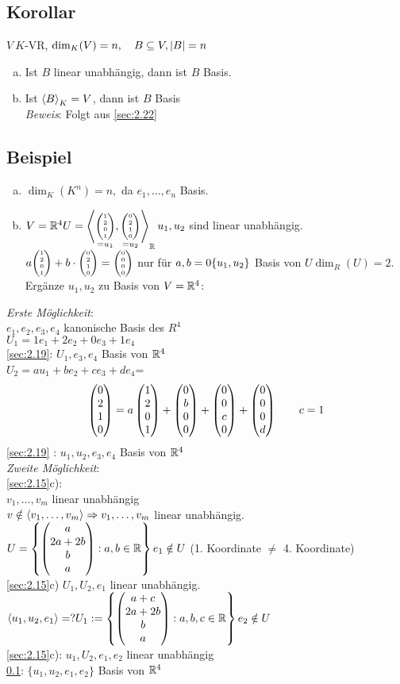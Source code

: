 \subsection{Korollar}\label{sec:2.24}
$V\ K$-VR, $\dim_K(V) = n,\quad B \subseteq V,\lvert B \rvert = n$
\begin{enumerate}[a)]
\item Ist $B$ linear unabhängig, dann ist $B$ Basis.
\item Ist $\left\langle B\right\rangle_K = V$, dann ist $B$ Basis\\
\emph{Beweis}: Folgt aus \ref{sec:2.22}
\end{enumerate}
\subsection{Beispiel}
\begin{enumerate}[a)]
\item $\dim_K(K^n) = n,$ da $e_1,\ldots,e_n$ Basis.
\item $V = \mathbb{R}^4\\
U = \left\langle\underset{= u_1}{\tiny\begin{pmatrix} 1\\2\\0\\1 \end{pmatrix}},\underset{= u_2}{\tiny\begin{pmatrix} 0\\2\\1\\0 \end{pmatrix}}\right\rangle_{\mathbb{R}}\\
u_1,u_2$ sind linear unabhängig.\\
$a{\tiny\begin{pmatrix} 1\\2\\0\\1 \end{pmatrix}} + b \cdot {\tiny\begin{pmatrix} 0\\2\\1\\0 \end{pmatrix}} = {\tiny \begin{pmatrix} 0\\0\\0\\0 \end{pmatrix}}$ nur für $a,b =0\\
\{u_1,u_2\}$ Basis von $U$\qquad $\dim_R(U) = 2.$\\
Ergänze $u_1,u_2$ zu Basis von $V = \mathbb{R}^4$:\end{enumerate}
\emph{Erste Möglichkeit}:\\
$e_1,e_2,e_3,e_4$ kanonische Basis des $R^4$\\
$U_1 = 1e_1 + 2e_2 + 0 e_3 + 1e_4$\\
\ref{sec:2.19}: $U_1,e_3,e_4$ Basis von $\mathbb{R}^4$\\
$U_2 = au_1 + be_2 + ce_3 + de_4$=
\[\begin{pmatrix} 0\\2\\1\\0 \end{pmatrix}= a\begin{pmatrix} 1\\2\\0\\1 \end{pmatrix} + \begin{pmatrix} 0\\b\\0\\0 \end{pmatrix} + \begin{pmatrix} 0\\0\\c\\0 \end{pmatrix} + \begin{pmatrix} 0\\0\\0\\d \end{pmatrix} \qquad c = 1 \]
\ref{sec:2.19} : $u_1,u_2,e_3,e_4$ Basis von $\mathbb{R}^4$\\
\emph{Zweite Möglichkeit}:\\
\ref{sec:2.15}c):\\
$v_1,\ldots,v_m$ linear unabhängig\\
$v \notin \left\langle v_1,\ldots,v_m\right\rangle \Rightarrow v_1,\ldots,v_m$ linear unabhängig.
$U = \left\{ \begin{pmatrix} a\\2a+2b\\b\\a \end{pmatrix}: a,b \in \mathbb{R} \right\}\\
e_1 \notin U$ (1. Koordinate $\ne$ 4. Koordinate)\\
\ref{sec:2.15}c) $U_1,U_2,e_1$ linear unabhängig.\\
$\left\langle u_1,u_2,e_1\right\rangle = ?\\
U_1 := \left\{ \begin{pmatrix} a+c\\2a+2b\\b\\a \end{pmatrix}:a,b,c \in \mathbb{R} \right\}\\
e_2 \notin U$\\
\ref{sec:2.15}c): $u_1,U_2,e_1,e_2$ linear unabhängig\\
\ref{sec:2.24}: $\{u_1,u_2,e_1,e_2\}$ Basis von $\mathbb{R}^4$

